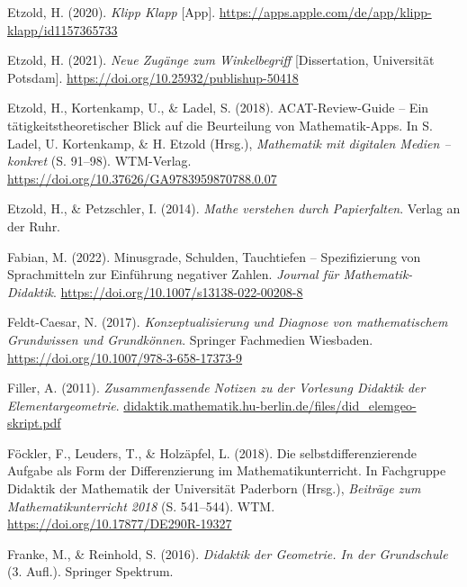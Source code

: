 \documentclass[
]{scrbook}
\newlength{\cslhangindent}
\newlength{\cslentryspacingunit} %
\newenvironment{CSLReferences}[2] %
 {%
  \setlength{\parindent}{0pt}
  \ifodd #1
  \let\oldpar\par
  \def\par{\hangindent=\cslhangindent\oldpar}
  \fi
  \setlength{\parskip}{#2\cslentryspacingunit}
 }%
 {}
\theoremstyle{definition}
\theoremstyle{definition}
\theoremstyle{definition}
\theoremstyle{definition}
\theoremstyle{remark}
\begin{document}
\begin{CSLReferences}{1}{0}
\leavevmode{}%
Etzold, H. (2020). \emph{Klipp {Klapp}} {[}App{]}. \url{https://apps.apple.com/de/app/klipp-klapp/id1157365733}

\leavevmode{}%
Etzold, H. (2021). \emph{Neue Zugänge zum Winkelbegriff} {[}Dissertation, Universität Potsdam{]}. \url{https://doi.org/10.25932/publishup-50418}

\leavevmode{}%
Etzold, H., Kortenkamp, U., \& Ladel, S. (2018). {ACAT}-{Review}-{Guide} -- {Ein} tätigkeitstheoretischer {Blick} auf die {Beurteilung} von {Mathematik}-{Apps}. In S. Ladel, U. Kortenkamp, \& H. Etzold (Hrsg.), \emph{Mathematik mit digitalen {Medien} -- konkret} (S. 91--98). WTM-Verlag. \url{https://doi.org/10.37626/GA9783959870788.0.07}

\leavevmode{}%
Etzold, H., \& Petzschler, I. (2014). \emph{Mathe verstehen durch {Papierfalten}}. Verlag an der Ruhr.

\leavevmode{}%
Fabian, M. (2022). Minusgrade, {Schulden}, {Tauchtiefen} -- {Speziﬁzierung} von {Sprachmitteln} zur {Einführung} negativer {Zahlen}. \emph{Journal für Mathematik-Didaktik}. \url{https://doi.org/10.1007/s13138-022-00208-8}

\leavevmode{}%
Feldt-Caesar, N. (2017). \emph{Konzeptualisierung und {Diagnose} von mathematischem {Grundwissen} und {Grundkönnen}}. Springer Fachmedien Wiesbaden. \url{https://doi.org/10.1007/978-3-658-17373-9}

\leavevmode{}%
Filler, A. (2011). \emph{Zusammenfassende {Notizen} zu der {Vorlesung} {Didaktik} der {Elementargeometrie}}. \href{https://didaktik.mathematik.hu-berlin.de/files/did_elemgeo-skript.pdf}{didaktik.mathematik.hu-berlin.de/files/did\_elemgeo-skript.pdf}

\leavevmode{}%
Föckler, F., Leuders, T., \& Holzäpfel, L. (2018). Die selbstdifferenzierende {Aufgabe} als {Form} der {Differenzierung} im {Mathematikunterricht}. In Fachgruppe Didaktik der Mathematik der Universität Paderborn (Hrsg.), \emph{Beiträge zum {Mathematikunterricht} 2018} (S. 541--544). WTM. \url{https://doi.org/10.17877/DE290R-19327}

\leavevmode{}%
Franke, M., \& Reinhold, S. (2016). \emph{Didaktik der {Geometrie}. {In} der {Grundschule}} (3. Aufl.). Springer Spektrum.


\end{CSLReferences}
\end{document}
